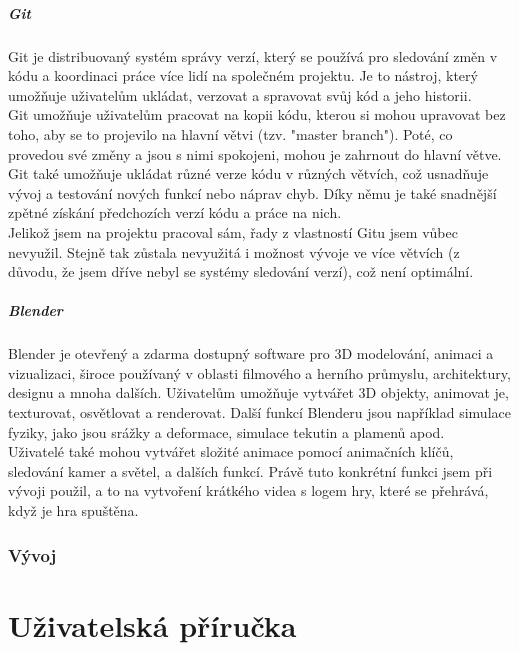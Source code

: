 \documentclass[12pt,a4paper,hidelinks]{article}
\begin{document}
\subsubsection{Git}
Git je distribuovaný systém správy verzí, který se používá pro sledování změn v kódu a koordinaci práce více lidí na společném projektu. Je to nástroj, který umožňuje uživatelům ukládat, verzovat a spravovat svůj kód a jeho historii.\\
Git umožňuje uživatelům pracovat na kopii kódu, kterou si mohou upravovat bez toho, aby se to projevilo na hlavní větvi (tzv. "master branch"). Poté, co provedou své změny a jsou s nimi spokojeni, mohou je zahrnout do hlavní větve. Git také umožňuje ukládat různé verze kódu v různých větvích, což usnadňuje vývoj a testování nových funkcí nebo náprav chyb. Díky němu je také snadnější zpětné získání předchozích verzí kódu a práce na nich.\\
Jelikož jsem na projektu pracoval sám, řady z vlastností Gitu jsem vůbec nevyužil. Stejně tak zůstala nevyužitá i možnost vývoje ve více větvích (z důvodu, že jsem dříve nebyl se systémy sledování verzí), což není optimální.\\
\subsubsection{Blender}
Blender je otevřený a zdarma dostupný software pro 3D modelování, animaci a vizualizaci, široce používaný v oblasti filmového a herního průmyslu, architektury, designu a mnoha dalších. Uživatelům umožňuje vytvářet 3D objekty, animovat je, texturovat, osvětlovat a renderovat. Další funkcí Blenderu jsou například simulace fyziky, jako jsou srážky a deformace, simulace tekutin a plamenů apod.\\
Uživatelé také mohou vytvářet složité animace pomocí animačních klíčů, sledování kamer a světel, a dalších funkcí. Právě tuto konkrétní funkci jsem při vývoji použil, a to na vytvoření krátkého videa s logem hry, které se přehrává, když je hra spuštěna.\\


\clearpage

\section{Vývoj}

\clearpage

\part{Uživatelská příručka}
\end{document}
